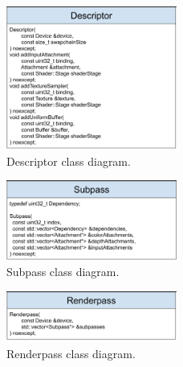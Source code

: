 \documentclass[12pt]{report}
\newcommand{\figurewidth}{0.6\textwidth}
\newcommand{\imagewidth}{0.5\textwidth}
\theoremstyle{definition}
\begin{document}
  \begin{figure}
    \centering
    \includegraphics[width=\imagewidth]{images/class_descriptor.png}
    \caption{Descriptor class diagram.}
    \label{fig:class_descriptor}
  \end{figure}

  \begin{figure}
    \centering
    \includegraphics[width=\imagewidth]{images/class_subpass.png}
    \caption{Subpass class diagram.}
    \label{fig:class_subpass}
  \end{figure}

  \begin{figure}
    \centering
    \includegraphics[width=\imagewidth]{images/class_renderpass.png}
    \caption{Renderpass class diagram.}
    \label{fig:class_renderpass}
  \end{figure}
\end{document}
